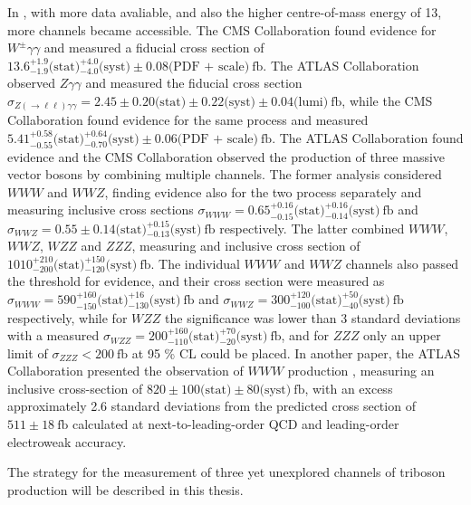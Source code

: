 In \RunII, with more data avaliable, and also the higher centre-of-mass energy of 13\TeV, more channels became accessible.
The CMS Collaboration found evidence for $W^\pm\gamma\gamma$ \cite{SMP-19-013} and measured a fiducial cross section of
$13.6^{+1.9}_{-1.9} \text{(stat)} {}^{+4.0}_{-4.0} \text{(syst)} \pm 0.08 \text{(PDF + scale)}~\text{fb}$.
The ATLAS Collaboration observed $Z\gamma\gamma$ \cite{STDM-2021-09} and measured the fiducial cross section $\sigma_{Z(\rightarrow \ell\ell)\gamma\gamma} = 2.45 \pm 0.20 \text{(stat)} \pm 0.22 \text{(syst)} \pm 0.04 \text{(lumi)}~\text{fb}$,
while the CMS Collaboration found evidence for the same process \cite{SMP-19-013} and measured $5.41^{+0.58}_{-0.55} \text{(stat)} {}^{+0.64}_{-0.70} \text{(syst)} \pm 0.06 \text{(PDF + scale)}~\text{fb}$.
The ATLAS Collaboration found evidence \cite{STDM-2017-22} and the CMS Collaboration observed \cite{SMP-19-014} the production of three massive vector bosons by combining multiple channels.
The former analysis considered $WWW$ and $WWZ$, finding evidence also for the two process separately and measuring inclusive cross sections
$\sigma_{WWW} = 0.65^{+0.16}_{-0.15} \text{(stat)} {}^{+0.16}_{-0.14} \text{(syst)}~\text{fb}$ and
$\sigma_{WWZ} = 0.55 \pm 0.14 \text{(stat)} {}^{+0.15}_{-0.13} \text{(syst)}~\text{fb}$ respectively.
The latter combined $WWW$, $WWZ$, $WZZ$ and $ZZZ$, measuring and inclusive cross section of $1010^{+210}_{-200}\text{(stat)}{}^{+150}_{-120}\text{(syst)}~\text{fb}$.
The individual $WWW$ and $WWZ$ channels also passed the threshold for evidence, and their cross section were measured as
$\sigma_{WWW} = 590 ^{+160}_{-150} \text{(stat)} {}^{+16}_{-130} \text{(syst)}~\text{fb}$ and
$\sigma_{WWZ} = 300 ^{+120}_{-100} \text{(stat)} {}^{+50}_{-40 } \text{(syst)}~\text{fb}$ respectively,
while for $WZZ$ the significance was lower than 3 standard deviations with a measured
$\sigma_{WZZ} = 200 ^{+160}_{-110} \text{(stat)} {}^{+70}_{-20 } \text{(syst)}~\text{fb}$,
and for $ZZZ$ only an upper limit of $\sigma_{ZZZ} < 200~\text{fb}$ at 95 \% CL could be placed.
In another paper, the ATLAS Collaboration presented the observation of $WWW$ production \cite{HDBS-2019-16},
measuring an inclusive cross-section of $820 \pm 100 \text{(stat)} \pm 80 \text{(syst)}~\text{fb}$,
with an excess approximately 2.6 standard deviations from the predicted cross section of $511 \pm 18~\text{fb}$ calculated at next-to-leading-order QCD and leading-order electroweak accuracy.

The strategy for the measurement of three yet unexplored channels of triboson production will be described in this thesis.


